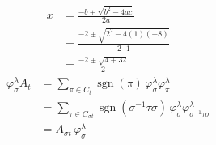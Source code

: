 \usepackage{mathtools}

\begin{align*}
x &= \frac{-b \pm \sqrt{b^2 - 4ac}}{2a} \\
&= \frac{-2 \pm \sqrt{2^2 - 4(1)(-8)}}{2 \cdot 1} \\
&= \frac{-2 \pm \sqrt{4 + 32}}{2}
\end{align*}
\begin{align*}
\varphi^\lambda_{\sigma} A_t
&= \sum_{\pi \in C_t} \operatorname{sgn}(\pi)\,
\varphi^\lambda_{\sigma}\varphi^\lambda_{\pi} \\
&= \sum_{\tau \in C_{\sigma t}}
\operatorname{sgn}(\sigma^{-1}\tau\sigma)\,
\varphi^\lambda_{\sigma}
\varphi^\lambda_{\sigma^{-1}\tau\sigma} \\
&= A_{\sigma t}\,\varphi^\lambda_{\sigma}
\end{align*}
